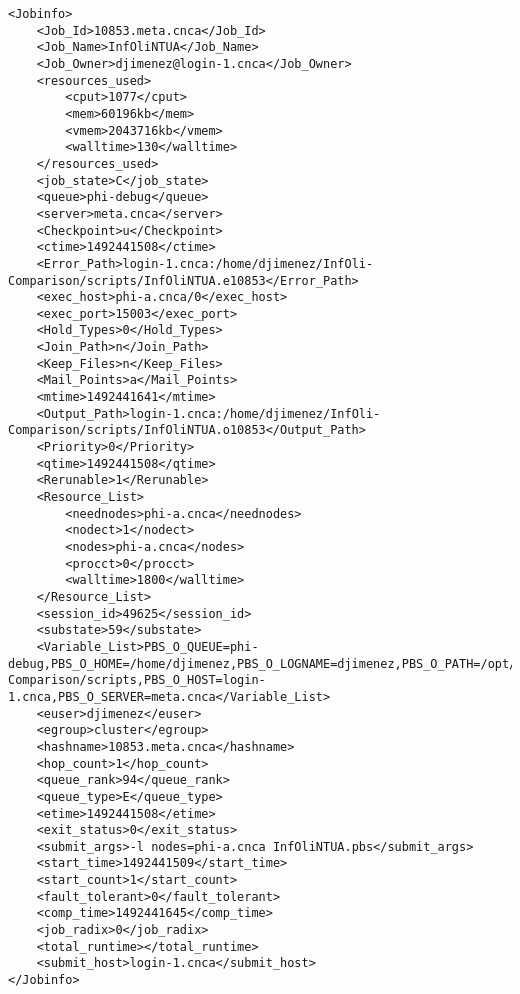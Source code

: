 \begin{lstlisting}
<Jobinfo>
	<Job_Id>10853.meta.cnca</Job_Id>
	<Job_Name>InfOliNTUA</Job_Name>
	<Job_Owner>djimenez@login-1.cnca</Job_Owner>
	<resources_used>
		<cput>1077</cput>
		<mem>60196kb</mem>
		<vmem>2043716kb</vmem>
		<walltime>130</walltime>
	</resources_used>
	<job_state>C</job_state>
	<queue>phi-debug</queue>
	<server>meta.cnca</server>
	<Checkpoint>u</Checkpoint>
	<ctime>1492441508</ctime>
	<Error_Path>login-1.cnca:/home/djimenez/InfOli-Comparison/scripts/InfOliNTUA.e10853</Error_Path>
	<exec_host>phi-a.cnca/0</exec_host>
	<exec_port>15003</exec_port>
	<Hold_Types>0</Hold_Types>
	<Join_Path>n</Join_Path>
	<Keep_Files>n</Keep_Files>
	<Mail_Points>a</Mail_Points>
	<mtime>1492441641</mtime>
	<Output_Path>login-1.cnca:/home/djimenez/InfOli-Comparison/scripts/InfOliNTUA.o10853</Output_Path>
	<Priority>0</Priority>
	<qtime>1492441508</qtime>
	<Rerunable>1</Rerunable>
	<Resource_List>
		<neednodes>phi-a.cnca</neednodes>
		<nodect>1</nodect>
		<nodes>phi-a.cnca</nodes>
		<procct>0</procct>
		<walltime>1800</walltime>
	</Resource_List>
	<session_id>49625</session_id>
	<substate>59</substate>
	<Variable_List>PBS_O_QUEUE=phi-debug,PBS_O_HOME=/home/djimenez,PBS_O_LOGNAME=djimenez,PBS_O_PATH=/opt/intel/compilers_and_libraries_2017.0.098/linux/bin/intel64:/opt/intel/compilers_and_libraries_2017.0.098/linux/mpi/intel64/bin:/opt/intel/debugger_2017/gdb/intel64_mic/bin:/opt/intel/compilers_and_libraries_2017.0.098/linux/mpi/intel64/bin:/opt/intel/compilers_and_libraries_2017.0.098/linux/bin/intel64:/opt/intel/compilers_and_libraries_2017.0.098/linux/mpi/intel64/bin:/opt/intel/debugger_2017/gdb/intel64_mic/bin:/usr/local/bin:/usr/bin:/usr/local/sbin:/usr/sbin:/home/djimenez/bin,PBS_O_MAIL=/var/spool/mail/djimenez,PBS_O_SHELL=/bin/bash,PBS_O_LANG=en_US.utf8,PBS_O_WORKDIR=/home/djimenez/InfOli-Comparison/scripts,PBS_O_HOST=login-1.cnca,PBS_O_SERVER=meta.cnca</Variable_List>
	<euser>djimenez</euser>
	<egroup>cluster</egroup>
	<hashname>10853.meta.cnca</hashname>
	<hop_count>1</hop_count>
	<queue_rank>94</queue_rank>
	<queue_type>E</queue_type>
	<etime>1492441508</etime>
	<exit_status>0</exit_status>
	<submit_args>-l nodes=phi-a.cnca InfOliNTUA.pbs</submit_args>
	<start_time>1492441509</start_time>
	<start_count>1</start_count>
	<fault_tolerant>0</fault_tolerant>
	<comp_time>1492441645</comp_time>
	<job_radix>0</job_radix>
	<total_runtime></total_runtime>
	<submit_host>login-1.cnca</submit_host>
</Jobinfo>

\end{lstlisting}

